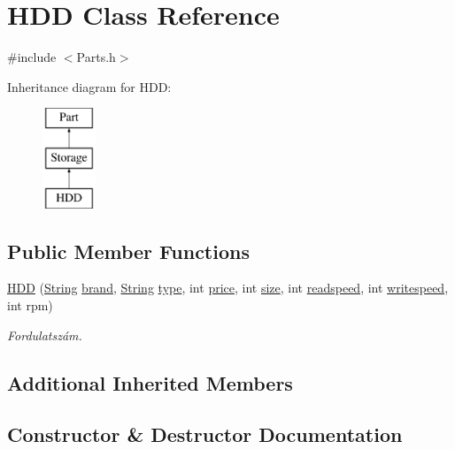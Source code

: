 \hypertarget{class_h_d_d}{}\section{H\+DD Class Reference}
\label{class_h_d_d}


{\ttfamily \#include $<$Parts.\+h$>$}

Inheritance diagram for H\+DD\+:\begin{figure}[H]
\begin{center}
\leavevmode
\includegraphics[height=3.000000cm]{class_h_d_d}
\end{center}
\end{figure}
\subsection*{Public Member Functions}
\begin{DoxyCompactItemize}
\item 
\mbox{\hyperlink{class_h_d_d_a375ad923cb64a11afc261fe1fac5276c}{H\+DD}} (\mbox{\hyperlink{class_string}{String}} \mbox{\hyperlink{class_part_ae06f2fdeb7fbbdb229a7aca151f3e341}{brand}}, \mbox{\hyperlink{class_string}{String}} \mbox{\hyperlink{class_part_a101dbcc5c4b21564df7414c7eb0eae88}{type}}, int \mbox{\hyperlink{class_part_a8e71223aed1da95a974f33d8d6c91bb1}{price}}, int \mbox{\hyperlink{class_storage_abcc80ce58a21fa884035617ee0b6cb67}{size}}, int \mbox{\hyperlink{class_storage_a41073842ff16961dad3903e6dd49bb0c}{readspeed}}, int \mbox{\hyperlink{class_storage_a0198a1483ccf849d48c76da88599ba8b}{writespeed}}, int rpm)
\begin{DoxyCompactList}\small\item\em Fordulatszám. \end{DoxyCompactList}\end{DoxyCompactItemize}
\subsection*{Additional Inherited Members}


\subsection{Constructor \& Destructor Documentation}
\mbox{\label{class_h_d_d_a375ad923cb64a11afc261fe1fac5276c}} 
